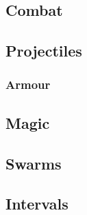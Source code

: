 \begin{multicols}{2}

\subsection*{}



\subsection*{Combat}





\commonWeaponsChart

\subsection*{Projectiles}



\subsubsection*{Armour}



\commonArmourChart

\subsubsection*{}


\subsection*{Magic}



\subsection*{Swarms}



\subsection*{Intervals}



\end{multicols}

